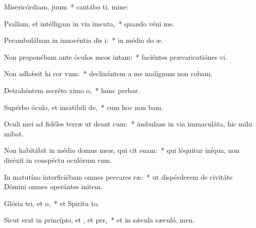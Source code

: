 \item Misericórdiam,  juum~* cantábo ti, mine:
\item Psallam, et intélligam in via imcuta,~* quando véni  me.
\item Perambulábam in innocéntia dis i:~* in médio do æ.
\item Non proponébam ante óculos meos  intam:~* faciéntes prævaricatiónes vi.
\item Non adhǽsit hi cor vum:~* declinántem a me malígnum non cobam.
\item Detrahéntem secréto ximo o,~* hunc perbar.
\item Supérbo óculo, et insatibili de,~* cum hoc non bam.
\item Oculi mei ad fidéles terræ ut deant cum:~* ámbulans in via immaculáta, hic mihi mibat.
\item Non habitábit in médio domus meæ, qui cit suam:~* qui lóquitur iníqua, non diréxit in conspéctu oculórum rum.
\item In matutíno interficiébam omnes peccares ræ:~* ut dispérderem de civitáte Dómini omnes operántes initem.
\item Glória tri, et o,~* et Spirítu to.
\item Sicut erat in princípio, et , et per,~* et in sǽcula sæculó. men.
